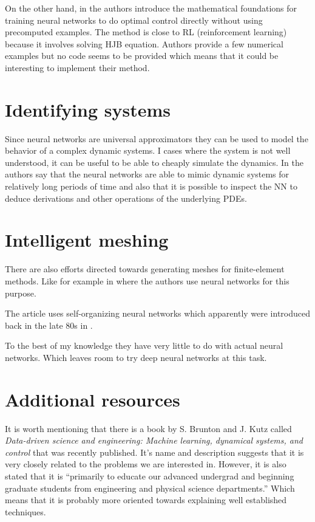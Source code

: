 \documentclass{article}
\begin{document}
On the other hand, in \cite{kunisch} the authors introduce the mathematical foundations for training neural networks to do optimal control directly without using precomputed examples.
The method is close to RL (reinforcement learning) because it involves solving HJB equation.
Authors provide a few numerical examples but no code seems to be provided which means that it could be interesting to implement their method.



\section{Identifying systems}

Since neural networks are universal approximators they can be used to model the behavior of a complex dynamic systems. 
I cases where the system is not well understood, it can be useful to be able to cheaply simulate the dynamics. 
In \cite{long2017pdenet} the authors say that the neural networks are able to mimic dynamic systems for relatively long periods of time and also that it is possible to inspect the NN to deduce derivations and other operations of the underlying PDEs.


\section{Intelligent meshing}

There are also efforts directed towards generating meshes for finite-element methods.
Like for example in \cite{meshing} where the authors use neural networks for this purpose.


The article uses self-organizing neural networks which apparently were introduced back in the late 80s in \cite{kohonen2012self}.

To the best of my knowledge they have very little to do with actual neural networks.
Which leaves room to try deep neural networks at this task.

\section{Additional resources}

It is worth mentioning that there is a book \cite{brunton2019data} by S. Brunton and J. Kutz called \textit{Data-driven science and engineering: Machine learning, dynamical systems, and control} that was recently published. 
It's name and description suggests that it is very closely related to the problems we are interested in.
However, it is also stated that it is ``primarily to educate our advanced undergrad and beginning graduate students from engineering and physical science departments.'' Which means that it is probably more oriented towards explaining well established techniques.




\end{document}
